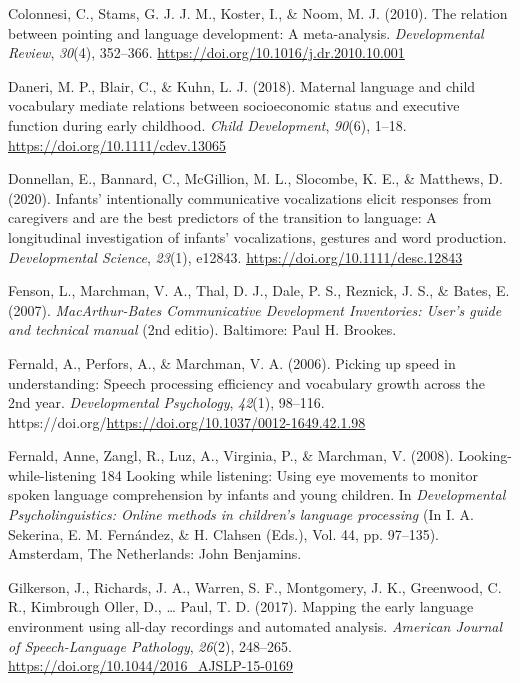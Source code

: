 \documentclass[
  man,floatsintext]{apa6}
\newlength{\cslhangindent}
\newlength{\cslentryspacingunit} %
\newenvironment{CSLReferences}[2] %
 {%
  \setlength{\parindent}{0pt}
  \ifodd #1
  \let\oldpar\par
  \def\par{\hangindent=\cslhangindent\oldpar}
  \fi
  \setlength{\parskip}{#2\cslentryspacingunit}
 }%
 {}
\begin{document}
\begin{CSLReferences}{1}{0}
\leavevmode{}%
Colonnesi, C., Stams, G. J. J. M., Koster, I., \& Noom, M. J. (2010). The relation between pointing and language development: {A} meta-analysis. \emph{Developmental Review}, \emph{30}(4), 352--366. \url{https://doi.org/10.1016/j.dr.2010.10.001}

\leavevmode{}%
Daneri, M. P., Blair, C., \& Kuhn, L. J. (2018). Maternal language and child vocabulary mediate relations between socioeconomic status and executive function during early childhood. \emph{Child Development}, \emph{90}(6), 1--18. \url{https://doi.org/10.1111/cdev.13065}

\leavevmode{}%
Donnellan, E., Bannard, C., McGillion, M. L., Slocombe, K. E., \& Matthews, D. (2020). Infants' intentionally communicative vocalizations elicit responses from caregivers and are the best predictors of the transition to language: {A} longitudinal investigation of infants' vocalizations, gestures and word production. \emph{Developmental Science}, \emph{23}(1), e12843. \url{https://doi.org/10.1111/desc.12843}

\leavevmode{}%
Fenson, L., Marchman, V. A., Thal, D. J., Dale, P. S., Reznick, J. S., \& Bates, E. (2007). \emph{{MacArthur}-{Bates} {Communicative} {Development} {Inventories}: {User}'s guide and technical manual} (2nd editio). Baltimore: Paul H. Brookes.

\leavevmode{}%
Fernald, A., Perfors, A., \& Marchman, V. A. (2006). Picking up speed in understanding: {Speech} processing efficiency and vocabulary growth across the 2nd year. \emph{Developmental Psychology}, \emph{42}(1), 98--116. https://doi.org/\url{https://doi.org/10.1037/0012-1649.42.1.98}

\leavevmode{}%
Fernald, Anne, Zangl, R., Luz, A., Virginia, P., \& Marchman, V. (2008). Looking-while-listening 184 {Looking} while listening: {Using} eye movements to monitor spoken language comprehension by infants and young children. In \emph{Developmental {Psycholinguistics}: {Online} methods in children's language processing} (In I. A. Sekerina, E. M. Fernández, \& H. Clahsen (Eds.), Vol. 44, pp. 97--135). Amsterdam, The Netherlands: John Benjamins.

\leavevmode{}%
Gilkerson, J., Richards, J. A., Warren, S. F., Montgomery, J. K., Greenwood, C. R., Kimbrough Oller, D., \ldots{} Paul, T. D. (2017). Mapping the early language environment using all-day recordings and automated analysis. \emph{American Journal of Speech-Language Pathology}, \emph{26}(2), 248--265. \url{https://doi.org/10.1044/2016_AJSLP-15-0169}


\end{CSLReferences}
\end{document}
